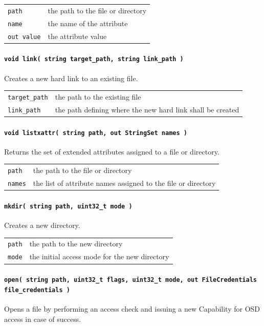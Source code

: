 \begin{tabularx}{\textwidth}{lX}
 \texttt{path} & the path to the file or directory\\
 \texttt{name} & the name of the attribute\\
 \texttt{out value} & the attribute value\\
\end{tabularx}

\paragraph{\texttt{void link( string target\_path, string link\_path )}}
Creates a new hard link to an existing file.

\begin{tabularx}{\textwidth}{lX}
 \texttt{target\_path} & the path to the existing file\\
 \texttt{link\_path} & the path defining where the new hard link shall be created\\
\end{tabularx}

\paragraph{\texttt{void listxattr( string path, out StringSet names )}}
Returns the set of extended attributes assigned to a file or directory.

\begin{tabularx}{\textwidth}{lX}
 \texttt{path} & the path to the file or directory\\
 \texttt{names} & the list of attribute names assigned to the file or directory\\
\end{tabularx}

\paragraph{\texttt{mkdir( string path, uint32\_t mode )}}
Creates a new directory.

\begin{tabularx}{\textwidth}{lX}
 \texttt{path} & the path to the new directory\\
 \texttt{mode} & the initial access mode for the new directory\\
\end{tabularx}

\paragraph{\texttt{open( string path, uint32\_t flags, uint32\_t mode, out FileCredentials file\_credentials )}}
Opens a file by performing an access check and issuing a new Capability for OSD access in case of success.

